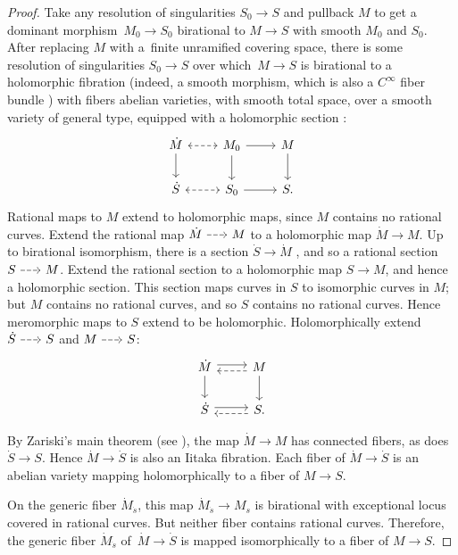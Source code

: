 \documentclass[11pt]{article}
\numberwithin{equation}{section}
\numberwithin{equation}{section}
\begin{document}
\begin{proof}
Take any resolution of singularities $S_0 \to S$ and pullback $M$ to get a dominant morphism~${M_0 \to S_0}$
birational to $M \to S$ with smooth $M_0$ and $S_0$.
After replacing $M$ with a~finite unramified covering space, there is some resolution of singularities $S_0 \longrightarrow
S$ over which~${M \to S}$ is birational to a holomorphic fibration (indeed, a smooth morphism, which is also a $C^{\infty}$ fiber bundle \cite[Definition 5.7]{Kollar:1993}) with fibers abelian varieties, with smooth total space, over a smooth variety of general type, equipped with a holomorphic
section \cite[Theorem~6.3]{Kollar:1993}:
\[
\begin{tikzcd}
\dot{M} \arrow[->]{d} \arrow[<->, dashed,densely dashed]{r} & M_0 \arrow[->]{r}\arrow[->]{d} & M \arrow[->]{d}\\
\dot{S} \arrow[<->, dashed,densely dashed]{r} & S_0 \arrow[->]{r} & S.
\end{tikzcd}
\]
Rational maps to $M$ extend to holomorphic maps, since $M$ contains no rational curves.
Extend the rational map $\rationalMap{\dot{M}}{M}$ to a holomorphic map $\dot{M} \to M$.
Up to birational isomorphism, there is a section $\dot{S} \longrightarrow
 \dot{M}$ \cite[Theorem 6.3]{Kollar:1993}, and so a rational section $\rationalMap{S}{M}$.
Extend the rational section to a holomorphic map $S \to M$, and hence a holomorphic section.
This section maps curves in $S$ to isomorphic curves in $M$; but $M$ contains no rational curves, and so $S$ contains no rational curves.
Hence meromorphic maps to $S$ extend to be holomorphic.
Holomorphically extend $\rationalMap{\dot{S}}{S}$ and $\rationalMap{M}{S}$:
\[
\begin{tikzcd}
\dot{M} \arrow[->,shift left]{r}\arrow[->]{d} & M \arrow[->]{d} \arrow[->, dashed,densely dashed,shift left]{l} \\
\dot{S} \arrow[->,shift left]{r} & S\arrow[->, dashed,densely dashed,shift left]{l}.
\end{tikzcd}
\]

By Zariski's main theorem (see \cite[Corollary 11.4]{Hartshorne:1977}), the map $\dot{M} \to M$ has connected fibers, as does $\dot{S} \to S$.
Hence $\dot{M} \to \dot{S}$ is also an Iitaka fibration.
Each fiber of $\dot{M}\to \dot{S}$ is an abelian variety mapping holomorphically to a fiber of $M \to S$.

On the generic fiber $\dot{M}_{\dot{s}}$, this map $\dot{M}_{\dot{s}}\to M_{s}$ is birational with exceptional locus covered in rational curves.
But neither fiber contains rational curves.
Therefore, the generic fiber $\dot{M}_{\dot{s}}$ of~$\dot{M}\to \dot{S}$ is mapped isomorphically to a fiber
of $M\to S$.


\end{proof}
\end{document}
